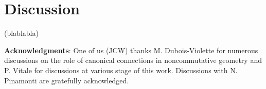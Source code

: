 \documentclass[a4paper,11pt,twoside]{article}
\numberwithin{equation}{section}
\theoremstyle{nonumberplain}
\newcounter{and}
\begin{document}

\section{Discussion}

(blablabla)


\vspace*{40pt}\noindent\textbf{Acknowledgments}: One of us (JCW) thanks M. Dubois-Violette for numerous discussions on the role of canonical connections in noncommutative geometry and P. Vitale for discussions at various stage of this work. Discussions with N. Pinamonti are gratefully acknowledged. 




\small
\end{document}
